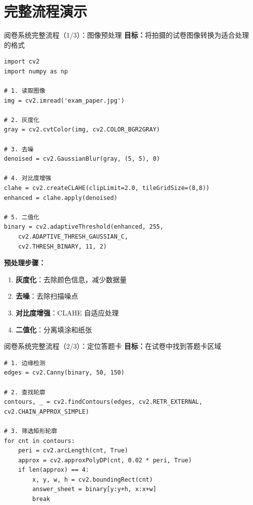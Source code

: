 
\section{完整流程演示}

\begin{frame}[fragile]{阅卷系统完整流程（1/3）：图像预处理}
    \textbf{目标：}将拍摄的试卷图像转换为适合处理的格式

    \begin{lstlisting}
import cv2
import numpy as np

# 1. 读取图像
img = cv2.imread('exam_paper.jpg')

# 2. 灰度化
gray = cv2.cvtColor(img, cv2.COLOR_BGR2GRAY)

# 3. 去噪
denoised = cv2.GaussianBlur(gray, (5, 5), 0)

# 4. 对比度增强
clahe = cv2.createCLAHE(clipLimit=2.0, tileGridSize=(8,8))
enhanced = clahe.apply(denoised)

# 5. 二值化
binary = cv2.adaptiveThreshold(enhanced, 255,
    cv2.ADAPTIVE_THRESH_GAUSSIAN_C,
    cv2.THRESH_BINARY, 11, 2)
    \end{lstlisting}

    \textbf{预处理步骤：}
    \begin{enumerate}
        \item \textbf{灰度化}：去除颜色信息，减少数据量
        \item \textbf{去噪}：去除扫描噪点
        \item \textbf{对比度增强}：CLAHE 自适应处理
        \item \textbf{二值化}：分离填涂和纸张
    \end{enumerate}
\end{frame}

\begin{frame}[fragile]{阅卷系统完整流程（2/3）：定位答题卡}
    \textbf{目标：}在试卷中找到答题卡区域

    \begin{lstlisting}
# 1. 边缘检测
edges = cv2.Canny(binary, 50, 150)

# 2. 查找轮廓
contours, _ = cv2.findContours(edges, cv2.RETR_EXTERNAL, cv2.CHAIN_APPROX_SIMPLE)

# 3. 筛选矩形轮廓
for cnt in contours:
    peri = cv2.arcLength(cnt, True)
    approx = cv2.approxPolyDP(cnt, 0.02 * peri, True)
    if len(approx) == 4:
        x, y, w, h = cv2.boundingRect(cnt)
        answer_sheet = binary[y:y+h, x:x+w]
        break
    \end{lstlisting}
\end{frame}

